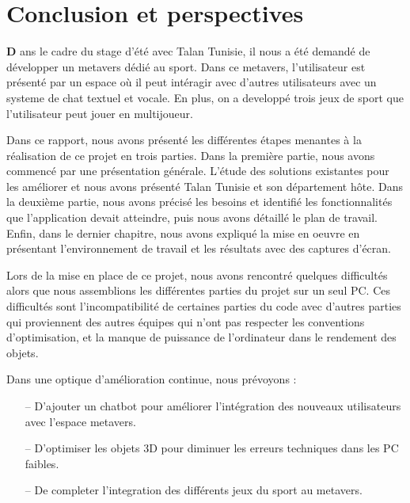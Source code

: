 \documentclass[12pt,a4paper,oneside,french]{book}
\begin{document}
\chapter*{\textbf{Conclusion et perspectives}}
\lettrine[findent=2pt]{\textbf{D}}{ }ans le cadre du stage d’été avec Talan Tunisie, il nous a été demandé de développer un metavers
dédié au sport. Dans ce metavers, l’utilisateur est présenté par un espace où il peut intéragir avec d’autres utilisateurs avec un systeme de chat textuel et vocale. En plus, on a developpé trois jeux de sport que l’utilisateur peut jouer en multijoueur.

Dans ce rapport, nous avons présenté les différentes étapes menantes à la réalisation de ce projet
en trois parties. Dans la première partie, nous avons commencé par une présentation générale. L’étude des solutions existantes pour les améliorer et nous avons présenté Talan Tunisie et son département hôte.
Dans la deuxième partie, nous avons précisé les besoins et identifié les fonctionnalités que l’application devait atteindre, puis nous avons détaillé le plan de travail.
Enfin, dans le dernier chapitre, nous avons expliqué la mise en
oeuvre en présentant l’environnement de travail et les résultats avec des captures d’écran.

Lors de la mise en place de ce projet, nous avons rencontré quelques difficultés alors que nous
assemblions les différentes parties du projet sur un seul PC. Ces difficultés sont l’incompatibilité de
certaines parties du code avec d’autres parties qui proviennent des autres équipes qui n'ont pas respecter les conventions d'optimisation, et la manque de puissance de l'ordinateur dans le rendement des objets.

Dans une optique d’amélioration continue, nous prévoyons :
\begin{itemize}
\item[--] D'ajouter un chatbot pour améliorer l’intégration des nouveaux utilisateurs avec l’espace metavers.
\item[--] D'optimiser les objets 3D pour diminuer les erreurs techniques dans les PC faibles.
\item[--] De completer l’integration des différents jeux du sport au metavers.
\end{itemize}
\begin{flushleft}
    
    
\end{flushleft}
\end{document}
